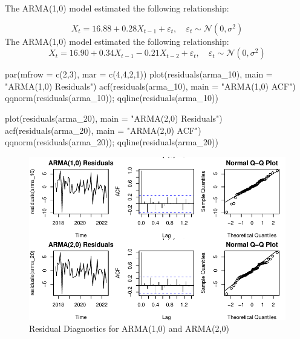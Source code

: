 \documentclass[
  11pt,
]{article}
\newenvironment{Shaded}{\begin{snugshade}}{\end{snugshade}}
\newcommand{\AttributeTok}[1]{\textcolor[rgb]{0.40,0.45,0.13}{#1}}
\newcommand{\DecValTok}[1]{\textcolor[rgb]{0.68,0.00,0.00}{#1}}
\newcommand{\FunctionTok}[1]{\textcolor[rgb]{0.28,0.35,0.67}{#1}}
\newcommand{\NormalTok}[1]{\textcolor[rgb]{0.00,0.23,0.31}{#1}}
\newcommand{\StringTok}[1]{\textcolor[rgb]{0.13,0.47,0.30}{#1}}
\begin{document}
The ARMA(1,0) model estimated the following relationship:

\[
X_t = 16.88 + 0.28 X_{t-1} + \varepsilon_t, \quad \varepsilon_t \sim \mathcal{N}(0, \sigma^2)
\] The ARMA(1,0) model estimated the following relationship: \[
X_t = 16.90 + 0.34 X_{t-1} - 0.21 X_{t-2} + \varepsilon_t, \quad \varepsilon_t \sim \mathcal{N}(0, \sigma^2)
\]

\begin{Shaded}
\begin{Highlighting}[]
\FunctionTok{par}\NormalTok{(}\AttributeTok{mfrow =} \FunctionTok{c}\NormalTok{(}\DecValTok{2}\NormalTok{,}\DecValTok{3}\NormalTok{), }\AttributeTok{mar =} \FunctionTok{c}\NormalTok{(}\DecValTok{4}\NormalTok{,}\DecValTok{4}\NormalTok{,}\DecValTok{2}\NormalTok{,}\DecValTok{1}\NormalTok{))}
\FunctionTok{plot}\NormalTok{(}\FunctionTok{residuals}\NormalTok{(arma\_10), }\AttributeTok{main =} \StringTok{"ARMA(1,0) Residuals"}\NormalTok{)}
\FunctionTok{acf}\NormalTok{(}\FunctionTok{residuals}\NormalTok{(arma\_10), }\AttributeTok{main =} \StringTok{"ARMA(1,0) ACF"}\NormalTok{)}
\FunctionTok{qqnorm}\NormalTok{(}\FunctionTok{residuals}\NormalTok{(arma\_10)); }\FunctionTok{qqline}\NormalTok{(}\FunctionTok{residuals}\NormalTok{(arma\_10))}

\FunctionTok{plot}\NormalTok{(}\FunctionTok{residuals}\NormalTok{(arma\_20), }\AttributeTok{main =} \StringTok{"ARMA(2,0) Residuals"}\NormalTok{)}
\FunctionTok{acf}\NormalTok{(}\FunctionTok{residuals}\NormalTok{(arma\_20), }\AttributeTok{main =} \StringTok{"ARMA(2,0) ACF"}\NormalTok{)}
\FunctionTok{qqnorm}\NormalTok{(}\FunctionTok{residuals}\NormalTok{(arma\_20)); }\FunctionTok{qqline}\NormalTok{(}\FunctionTok{residuals}\NormalTok{(arma\_20))}
\end{Highlighting}
\end{Shaded}

\begin{figure}[H]

{\centering \includegraphics{project_files/figure-pdf/fig-arma-diagnostics-1.pdf}

}

\caption{Residual Diagnostics for ARMA(1,0) and ARMA(2,0)}

\end{figure}%
\end{document}

